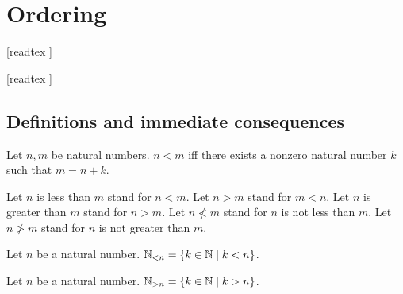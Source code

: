 \documentclass[../arithmetic.tex]{subfiles}
\begin{document}
  \chapter{Ordering}\label{chapter:ordering}


  \begin{forthel}

    [readtex ]

    [readtex ]

  \end{forthel}


  \section{Definitions and immediate consequences}

  \begin{forthel}
    \begin{definition}
      Let $n, m$ be natural numbers.
      $n < m$ iff there exists a nonzero natural number $k$ such that
      $m = n + k$.
    \end{definition}

    Let $n$ is less than $m$ stand for $n < m$.
    Let $n > m$ stand for $m < n$.
    Let $n$ is greater than $m$ stand for $n > m$.
    Let $n \nless m$ stand for $n$ is not less than $m$.
    Let $n \ngtr m$ stand for $n$ is not greater than $m$.
  \end{forthel}

  \begin{forthel}
    \begin{definition}
      Let $n$ be a natural number.
      $\mathbb{N}_{< n} = \{ k \in \mathbb{N} \mid k < n \}$.
    \end{definition}
  \end{forthel}

  \begin{forthel}
    \begin{definition}
      Let $n$ be a natural number.
      $\mathbb{N}_{> n} = \{ k \in \mathbb{N} \mid k > n \}$.
    \end{definition}
  \end{forthel}
\end{document}
